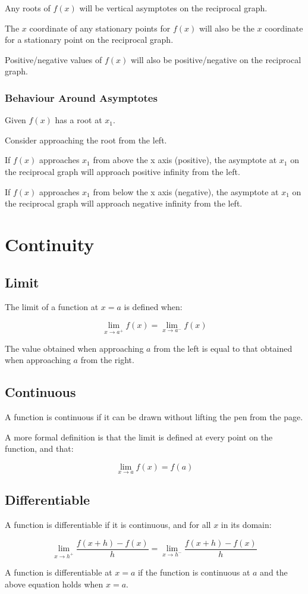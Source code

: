 \documentclass[a4paper,11pt]{article}
\begin{document}
Any roots of $f(x)$ will be vertical asymptotes on the reciprocal graph.

The $x$ coordinate of any stationary points for $f(x)$ will also be the $x$
coordinate for a stationary point on the reciprocal graph.

Positive/negative values of $f(x)$ will also be positive/negative on the
reciprocal graph.


\subsubsection{Behaviour Around Asymptotes}

Given $f(x)$ has a root at $x_1$.

Consider approaching the root from the left.

If $f(x)$ approaches $x_1$ from above the x axis (positive), the asymptote at
$x_1$ on the reciprocal graph will approach positive infinity from the left.

If $f(x)$ approaches $x_1$ from below the x axis (negative), the asymptote at
$x_1$ on the reciprocal graph will approach negative infinity from the left.




\section{Continuity}

\subsection{Limit}

The limit of a function at $x = a$ is defined when:

$$
\lim_{x \to a^+} f(x) = \lim_{x \to a^-} f(x)
$$

The value obtained when approaching $a$ from the left is equal to that obtained
when approaching $a$ from the right.


\subsection{Continuous}

A function is continuous if it can be drawn without lifting the pen from the
page.

A more formal definition is that the limit is defined at every point on the
function, and that:

$$
\lim_{x \to a} f(x) = f(a)
$$


\subsection{Differentiable}

A function is differentiable if it is continuous, and for all $x$ in its domain:

$$
\lim_{x \to h^+} \frac{f(x + h) - f(x)}{h} = \lim_{x \to h^-} \frac{f(x + h) - f(x)}{h}
$$

A function is differentiable at $x = a$ if the function is continuous at $a$
and the above equation holds when $x = a$.
\end{document}
